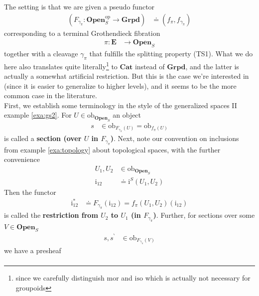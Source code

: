 \begin{exa}
\label{exa:gs4}
The setting is that we are given a pseudo functor
\begin{align*}
  \left(
    F_{\gamma_{\pi}}
    \colon
    \mathbf{Open}_{S}^{\mathrm{op}}
    \rightarrow
    \mathbf{Grpd}
  \right)
  &\doteq
  \left(
    f_{\pi},
    f_{\gamma_{\pi}}
  \right)
\end{align*}
corresponding to a terminal Grothendieck fibration
\begin{align*}
  \pi
  \colon
  \mathbf{E}
  &\rightarrow
  \mathbf{Open}_{S}
\end{align*}
together with a cleavage $\gamma_{\pi}$ that fulfills the splitting property (TS1).
What we do here also translates quite literally\footnote{since we carefully distinguish $\mathrm{mor}$ and $\mathrm{iso}$ which is actually not necessary for groupoids} to $\mathbf{Cat}$ instead of $\mathbf{Grpd}$, and the latter is actually a somewhat artificial restriction.
But this is the case we're interested in (since it is easier to generalize to higher levels), and it seems to be the more common case in the literature.
\\
First, we establish some terminology in the style of the generalized spaces II example \ref{exa:gs2}.
For $U \in \mathrm{ob}_{\mathbf{Open}_{S}}$ an object
\begin{align*}
  s
  &\in
  \mathrm{ob}_{F_{\gamma_{\pi}}(U)}
  =
  \mathrm{ob}_{f_{\pi}(U)}
\end{align*}
is called a \textbf{section (over $U$ in $F_{\gamma_{\pi}}$)}.
Next, note our convention on inclusions from example \ref{exa:topology} about topological spaces, with the further convenience
\begin{align*}
  U_{1},
  U_{2}
  &\in
  \mathrm{ob}_{\mathbf{Open}_{S}}
  \\
  \mathrm{i}_{12}
  &\doteq
  \mathrm{i}^{S}(U_{1},U_{2})
\end{align*}
Then the functor
\begin{align*}
  \mathrm{i}_{12}^{\ast}
  &\doteq
  F_{\gamma_{\pi}}(\mathrm{i}_{12})
  =
  f_{\pi}(U_{1},U_{2})(\mathrm{i}_{12})
\end{align*}
is called the \textbf{restriction from $U_{2}$ to $U_{1}$ (in $F_{\gamma_{\pi}}$)}.
Further, for sections over some $V \in \mathbf{Open}_{S}$
\begin{align*}
  s,
  s^{\backprime}
  &\in
  \mathrm{ob}_{F_{\gamma_{\pi}}(V)}
\end{align*}
we have a presheaf
\begin{align*}

\end{align*}
\end{exa}
